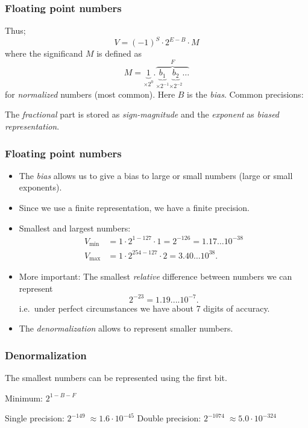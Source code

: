 \begin{frame}
  \frametitle{Floating point numbers}
  Thus;
  \[
    V = (-1)^S \cdot 2^{E-B}\cdot M
  \]
  where the significand $M$ is defined as
  \[
    M = \underbrace{1}_{\times2^0} .
    \overbrace{\underbrace{b_1}_{\times2^{-1}}
      \underbrace{b_2}_{\times2^{-2}}\ldots}^{F}
  \]
  for \textit{normalized} numbers (most common). Here $B$ is the \emph{bias}. Common
  precisions:
  \begin{center}
    
  \end{center}

The \textit{fractional} part is stored as \textit{sign-magnitude} and the \textit{exponent} as \textit{biased representation}.

\end{frame}

\begin{frame}
  \frametitle{Floating point numbers}
  \begin{itemize}
  \item The \emph{bias} allows us to give a bias to large or small numbers
    (large or small exponents).
  \item Since we use a finite representation, we have a finite precision.
  \item Smallest and largest numbers:
    \begin{align*}
      V_\text{min} &= 1\cdot 2^{1-127}\cdot 1 = 2^{-126} = 1.17\ldots 10^{-38} \\
      V_\text{max} &= 1\cdot 2^{254-127}\cdot 2 = 3.40\ldots 10^{38}.
    \end{align*}
  \item More important: The smallest \emph{relative} difference between numbers
    we can represent
    \[
      2^{-23} = 1.19....10^{-7}.
    \]
    i.e.~under perfect circumstances we have about 7 digits of accuracy.
  \item The \textit{denormalization} allows to represent smaller numbers.
  \end{itemize}
\end{frame}

\begin{frame}
  \frametitle{Denormalization}

The smallest numbers can be represented using the first bit.

\medskip
Minimum: $2^{1-B-F}$

\medskip
Single precision: $2^{-149}\;\approx 1.6\cdot 10^{-45}$
Double precision: $2^{-1074}\;\approx 5.0\cdot 10^{-324}$
\end{frame}

